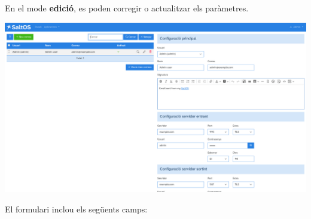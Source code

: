 \documentclass[a4paper]{article}
\begin{document}
En el mode \textbf{edició}, es poden corregir o actualitzar els paràmetres.

\begin{center}\includegraphics[width=1\textwidth]{../ujest/snaps/test-screenshots-js-screenshots-emails-emails-accounts-edit-1-ca-es-1-snap.png}\end{center}

El formulari inclou els següents camps:
\end{document}
